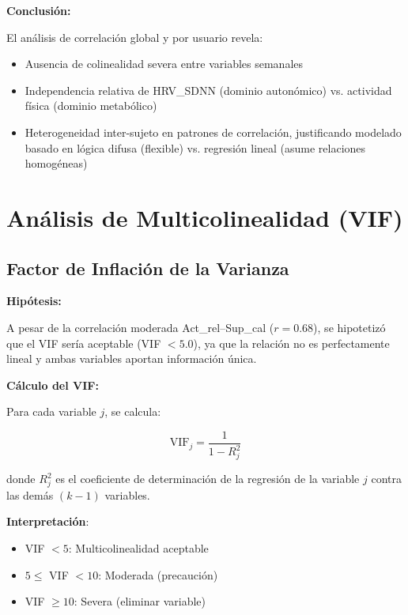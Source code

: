 \documentclass[12pt,letterpaper,twoside]{report}
\begin{document}
\begin{calculobox}
\begin{conclusionbox}
\textbf{Conclusión:}

El análisis de correlación global y por usuario revela:
\begin{itemize}[noitemsep]
    \item Ausencia de colinealidad severa entre variables semanales
    \item Independencia relativa de HRV\_SDNN (dominio autonómico) vs. actividad física (dominio metabólico)
    \item Heterogeneidad inter-sujeto en patrones de correlación, justificando modelado basado en lógica difusa (flexible) vs. regresión lineal (asume relaciones homogéneas)
\end{itemize}
\end{conclusionbox}

\section{Análisis de Multicolinealidad (VIF)}

\subsection{Factor de Inflación de la Varianza}

\begin{hipotesisbox}
\textbf{Hipótesis:}

A pesar de la correlación moderada Act\_rel--Sup\_cal ($r=0.68$), se hipotetizó que el VIF sería aceptable (VIF $< 5.0$), ya que la relación no es perfectamente lineal y ambas variables aportan información única.
\end{hipotesisbox}

\begin{estadisticobox}
\textbf{Cálculo del VIF:}

Para cada variable $j$, se calcula:

\begin{equation}
\text{VIF}_j = \frac{1}{1 - R^2_j}
\end{equation}

donde $R^2_j$ es el coeficiente de determinación de la regresión de la variable $j$ contra las demás $(k-1)$ variables.

\textbf{Interpretación}:
\begin{itemize}[noitemsep]
    \item VIF $< 5$: Multicolinealidad aceptable
    \item $5 \leq$ VIF $< 10$: Moderada (precaución)
    \item VIF $\geq 10$: Severa (eliminar variable)
\end{itemize}
\end{estadisticobox}


\end{calculobox}
\end{document}

